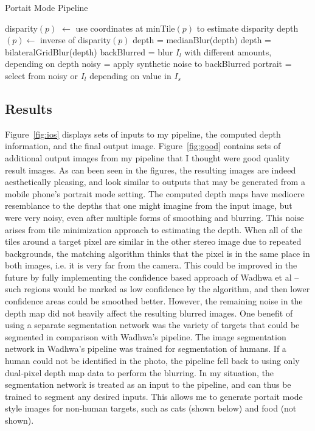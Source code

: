 \documentclass{article}
\begin{document}
\begin{algorithm}
\caption{Portait Mode Pipeline}
\label{alg:portrait}

    disparity$(p)$ $\gets$ use coordinates at minTile$(p)$ to estimate disparity \;
    depth$(p) \gets$ inverse of disparity$(p)$ \;
    depth = medianBlur(depth) \;
    depth = bilateralGridBlur(depth) \;
    backBlurred = blur $I_l$ with different amounts, depending on depth \;
    noisy = apply synthetic noise to backBlurred \;
    portrait = select from noisy or $I_l$ depending on value in $I_s$ \;
\end{algorithm}

\subsection{Results}

Figure~\ref{fig:ios} displays sets of inputs to my pipeline, the computed depth information, and the final output image.
%
Figure~\ref{fig:good} contains sets of additional output images from my pipeline that I thought were good quality result images.
%
As can been seen in the figures, the resulting images are indeed aesthetically pleasing, and look similar to outputs that may
be generated from a mobile phone's portrait mode setting.
%
The computed depth maps have mediocre resemblance to the depths that one might imagine from the input image, but were very noisy,
even after multiple forms of smoothing and blurring.
%
This noise arises from tile minimization approach to estimating the depth.
%
When all of the tiles around a target pixel are similar in the other stereo image due to repeated backgrounds, the matching
algorithm thinks that the pixel is in the same place in both images, i.e. it is very far from the camera.
%
This could be improved in the future by fully implementing the confidence based approach of Wadhwa et al -- such regions would be
marked as low confidence by the algorithm, and then lower confidence areas could be smoothed better.
%
However, the remaining noise in the depth map did not heavily affect the resulting blurred images.
%
One benefit of using a separate segmentation network was the variety of targets that could be segmented in comparison with Wadhwa's
pipeline.
%
The image segmentation network in Wadhwa's pipeline was trained for segmentation of humans.
%
If a human could not be identified in the photo, the pipeline fell back to using only dual-pixel depth map data to perform the
blurring.
%
In my situation, the segmentation network is treated as an input to the pipeline, and can thus be trained to segment any desired
inputs.
%
This allows me to generate portait mode style images for non-human targets, such as cats (shown below) and food (not shown).
\end{document}
